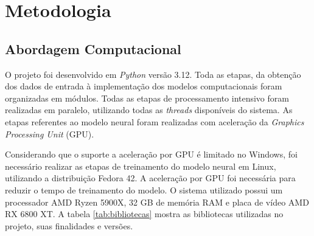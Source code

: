 \chapter{Metodologia} %
\section{Abordagem Computacional} %

O projeto foi desenvolvido em \textit{Python} versão 3.12. Toda as etapas, da obtenção dos dados de entrada à implementação
dos modelos computacionais foram organizadas em módulos. Todas as etapas de processamento intensivo foram realizadas em
paralelo, utilizando todas as \textit{threads} disponíveis do sistema. As etapas referentes ao modelo neural foram 
realizadas com aceleração da \textit{Graphics Processing Unit} (GPU).

Considerando que o suporte a aceleração por GPU é limitado no Windows, foi necessário realizar as etapas de treinamento do modelo 
neural em Linux, utilizando a distribuição Fedora 42. A aceleração por GPU foi necessária para reduzir o tempo de treinamento do modelo. 
O sistema utilizado possui um processador AMD Ryzen 5900X, 32 GB de memória RAM e placa de vídeo AMD RX 6800 XT. A tabela 
\ref{tab:bibliotecas} mostra as bibliotecas utilizadas no projeto, suas finalidades e versões.

